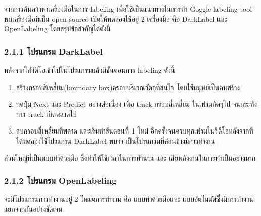 จากการค้นคว้าหาเครื่องมือในการ labeling เพื่อใช้เป็นแนวทางในการทำ Goggle labeling tool พบเครื่องมือที่เป็น open source เปิดให้ทดลองใช้อยู่ 2 เครื่องมือ คือ DarkLabel และ OpenLabeling โดยสรุปข้อสำคัญได้ดังนี้ 

\subsubsection*{2.1.1 โปรแกรม DarkLabel}
หลังจากใส่วิดิโอเข้าไปในโปรแกรมแล้วมีขั้นตอนการ labeling ดังนี้ 
\begin{enumerate}
	\setlength\itemsep{-0.25em}
	\item สร้างกรอบสี่เหลี่ยม(boundary box)ครอบบริเวณวัตถุที่สนใจ โดยใช้มนุษย์เป็นคนสร้าง
	\item กดปุ่ม Next และ Predict อย่างต่อเนื่อง เพื่อ track กรอบสี่เหลี่ยม ในเฟรมถัดๆไป จนกระทั่งการ track เกิดพลาดไป
	\item ลบกรอบสี่เหลี่ยมที่พลาด และเริ่มทำขั้นตอนที่ 1 ใหม่ อีกครั้งจนครบทุกเฟรมในวิดีโอหลังจากที่ได้ทดลองใช้โปรแกรม DarkLabel พบว่า เป็นโปรแกรมที่ค่อนข้างมีการทำงาน
\end{enumerate}
ส่วนใหญ่ที่เป็นแบบทำด้วยมือ ซึ่งทำให้ใช้เวลาในการทำนาน และ เสียพลังงานในการทำเป็นอย่างมาก

\subsubsection*{2.1.2 โปรแกรม OpenLabeling}
จะมีโปรแกรมการทำงานอยู่ 2 โหมดการทำงาน คือ แบบทำด้วยมือและ แบบอัตโนมัติซึ่งมีการทำงานแยกจากกันอย่างชัดเจน

